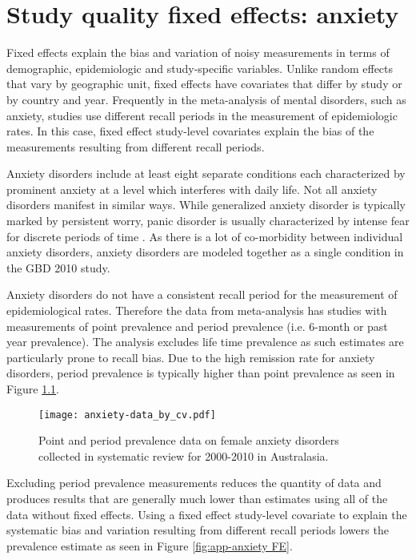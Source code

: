\chapter{Study quality fixed effects: anxiety}
\label{applications-efx_study_level}

Fixed effects explain the bias and variation of noisy measurements in terms of demographic, epidemiologic and study-specific variables.  Unlike random effects that vary by geographic unit, fixed effects have covariates that differ by study or by country and year.  Frequently in the meta-analysis of mental disorders, such as anxiety, studies use different recall periods in the measurement of epidemiologic rates.  In this case, fixed effect study-level covariates explain the bias of the measurements resulting from different recall periods.

Anxiety disorders include at least eight separate conditions each characterized by prominent anxiety at a level which interferes with daily life.  Not all anxiety disorders manifest in similar ways.  While generalized anxiety disorder is typically marked by persistent worry, panic disorder is usually characterized by intense fear for discrete periods of time \cite{american_diagnostic_2000}.  As there is a lot of co-morbidity between individual anxiety disorders, anxiety disorders are modeled together as a single condition in the GBD 2010 study.

Anxiety disorders do not have a consistent recall period for the measurement of epidemiological rates.  Therefore the data from meta-analysis has studies with measurements of point prevalence and period prevalence (i.e. 6-month or past year prevalence).  The analysis excludes life time prevalence as such estimates are particularly prone to recall bias.  Due to the high remission rate for anxiety disorders, period prevalence is typically higher than point prevalence as seen in Figure \ref{fig:app-anxiety data}.

    \begin{figure}[h]
        \begin{center}
            \texttt{[image: anxiety-data\_by\_cv.pdf]}
            \caption{Point and period prevalence data on female anxiety disorders collected in systematic review for 2000-2010 in Australasia.}
            \label{fig:app-anxiety data}
        \end{center}
    \end{figure}

Excluding period prevalence measurements reduces the quantity of data and produces results that are generally much lower than estimates using all of the data without fixed effects.  Using a fixed effect study-level covariate to explain the systematic bias and variation resulting from different recall periods lowers the prevalence estimate as seen in Figure \ref{fig:app-anxiety FE}.

